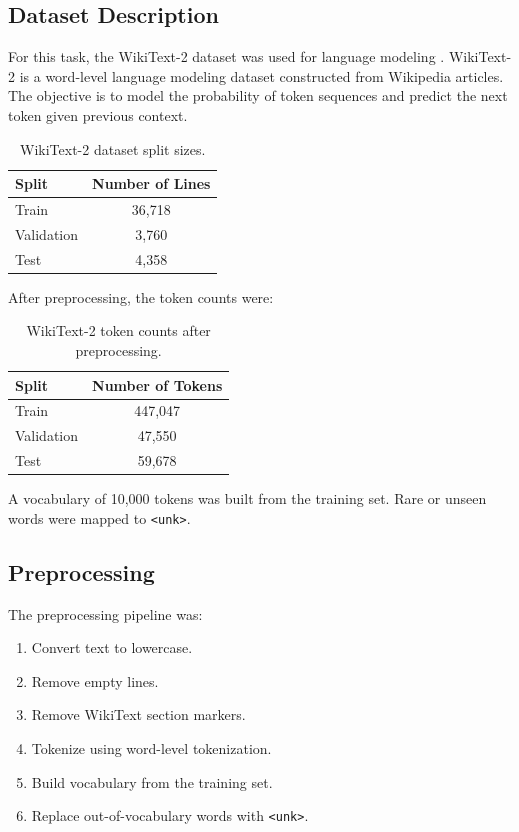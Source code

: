 \documentclass[11pt,a4paper]{article}
\begin{document}
\subsection{Dataset Description}

For this task, the WikiText-2 dataset was used for language modeling \cite{merity2016wikitext}. WikiText-2 is a word-level language modeling dataset constructed from Wikipedia articles. The objective is to model the probability of token sequences and predict the next token given previous context.

\begin{table}[H]
\centering
\caption{WikiText-2 dataset split sizes.}
\begin{tabular}{lc}
\toprule
Split & Number of Lines \\
\midrule
Train & 36,718 \\
Validation & 3,760 \\
Test & 4,358 \\
\bottomrule
\end{tabular}
\end{table}

After preprocessing, the token counts were:

\begin{table}[H]
\centering
\caption{WikiText-2 token counts after preprocessing.}
\begin{tabular}{lc}
\toprule
Split & Number of Tokens \\
\midrule
Train & 447,047 \\
Validation & 47,550 \\
Test & 59,678 \\
\bottomrule
\end{tabular}
\end{table}

A vocabulary of 10,000 tokens was built from the training set. Rare or unseen words were mapped to \texttt{<unk>}.

\subsection{Preprocessing}

The preprocessing pipeline was:

\begin{enumerate}[leftmargin=*]
    \item Convert text to lowercase.
    \item Remove empty lines.
    \item Remove WikiText section markers.
    \item Tokenize using word-level tokenization.
    \item Build vocabulary from the training set.
    \item Replace out-of-vocabulary words with \texttt{<unk>}.
\end{enumerate}
\end{document}
